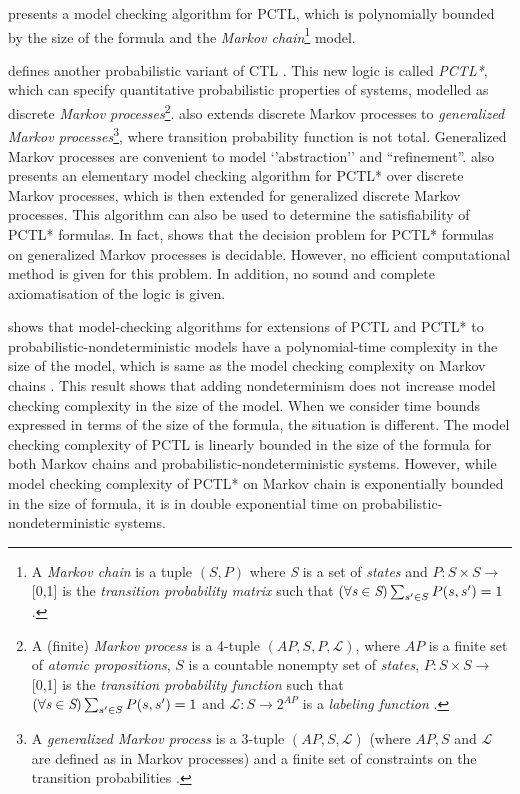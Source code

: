 \documentclass[11pt]{article}
\begin{document}
\cite{HJ94} presents a model checking algorithm for  PCTL, which is polynomially bounded by the size of the formula  and the \emph{Markov chain}\footnote{A \emph{Markov chain} is a tuple $(S,P)$ where \emph{S} is a set of \emph{states} and $P: S \times S \rightarrow$ [0,1] is the \emph{transition probability matrix} such that  $(\forall \emph{s} \in \emph{S}) \sum_{s' \in S}P(s,s') = 1$ \cite{Rab03}.} model.

\cite{ASB95} defines another probabilistic variant of CTL \cite{CES86}. This new logic is called \emph{PCTL*}, which can specify quantitative probabilistic properties of systems, modelled as discrete \emph{Markov processes}\footnote{A (finite) \emph{Markov process} is a 4-tuple $(AP,S,P,\mathcal{L})$, where $AP$ is a finite set of \emph{atomic propositions}, $S$ is a countable nonempty set of \emph{states}, $P: S \times S \rightarrow$ [0,1] is the \emph{transition probability function} such that $(\forall \emph{s} \in \emph{S}) \sum_{s' \in S}P(s,s') = 1$ and $\mathcal{L} : S \rightarrow 2^{AP}$ is a \emph{labeling function} \cite{ASB95}.}. \cite{CES86} also extends discrete Markov processes to  \emph{generalized Markov processes}\footnote{A \emph{generalized Markov process} is a 3-tuple $(AP,S,\mathcal{L})$ (where $AP,S$ and $\mathcal{L}$ are defined as in Markov processes) and a finite set of constraints on the transition probabilities \cite{ASB95}.}, where transition probability function is not total. Generalized Markov processes are convenient to model `'abstraction'' and ``refinement''.  \cite{ASB95} also presents an elementary model checking algorithm for PCTL* over discrete Markov processes, which is then extended for generalized discrete Markov processes. This algorithm can also be used to determine the satisfiability of PCTL* formulas. In fact, \cite{ASB95} shows that the decision problem for PCTL* formulas on generalized Markov processes is decidable. However, no efficient computational method is given for this problem. In addition, no sound and complete axiomatisation of the logic is given.

\cite{BA95} shows that model-checking algorithms for extensions of PCTL and PCTL* to probabilistic-nondeterministic models have a polynomial-time complexity in the size of the model, which is same as the model checking complexity on Markov chains  \cite{HJ89,HJ94,ASB95}. This result shows that adding nondeterminism does not increase model checking complexity in the size of the model. When we consider time bounds expressed in terms of the size of the formula, the situation is different. The model checking complexity of PCTL is linearly bounded in the size of the formula for both Markov chains and probabilistic-nondeterministic systems. However, while model checking complexity of PCTL* on Markov chain is exponentially bounded in the size of formula, it is in double exponential time on probabilistic-nondeterministic systems. 
\end{document}
